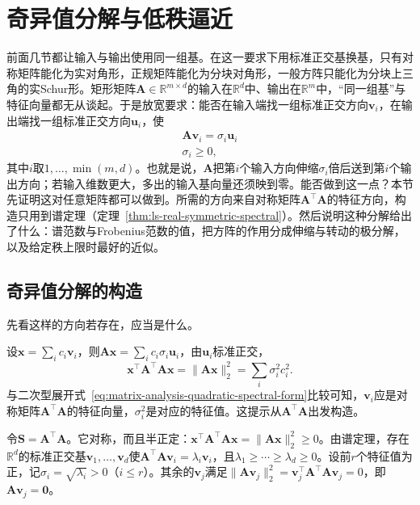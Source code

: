 
\section{奇异值分解与低秩逼近}
\label{sec:ls-svd}

前面几节都让输入与输出使用同一组基。在这一要求下用标准正交基换基，只有对称矩阵能化为实对角形，正规矩阵能化为分块对角形，一般方阵只能化为分块上三角的实Schur形。矩形矩阵$\bm A\in\mathbb R^{m\times d}$的输入在$\mathbb R^d$中、输出在$\mathbb R^m$中，“同一组基”与特征向量都无从谈起。于是放宽要求：能否在输入端找一组标准正交方向$\bm v_i$，在输出端找一组标准正交方向$\bm u_i$，使
\[
\begin{gathered}
\bm A\bm v_i=\sigma_i\bm u_i\\
\sigma_i\geq0,
\end{gathered}
\]
其中$i$取$1,\ldots,\min(m,d)$。也就是说，$\bm A$把第$i$个输入方向伸缩$\sigma_i$倍后送到第$i$个输出方向；若输入维数更大，多出的输入基向量还须映到零。能否做到这一点？本节先证明这对任意矩阵都可以做到。所需的方向来自对称矩阵$\bm A^\top\bm A$的特征方向，构造只用到谱定理（定理~\ref{thm:ls-real-symmetric-spectral}）。然后说明这种分解给出了什么：谱范数与Frobenius范数的值，把方阵的作用分成伸缩与转动的极分解，以及给定秩上限时最好的近似。

\subsection{奇异值分解的构造}

先看这样的方向若存在，应当是什么。

设$\bm x=\sum_ic_i\bm v_i$，则$\bm A\bm x=\sum_ic_i\sigma_i\bm u_i$，由$\bm u_i$标准正交，
\[
 \bm x^\top\bm A^\top\bm A\bm x=\lVert\bm A\bm x\rVert_2^2=\sum_i\sigma_i^2c_i^2 .
\]
与二次型展开式~\eqref{eq:matrix-analysis-quadratic-spectral-form}比较可知，$\bm v_i$应是对称矩阵$\bm A^\top\bm A$的特征向量，$\sigma_i^2$是对应的特征值。这提示从$\bm A^\top\bm A$出发构造。

令$\bm S=\bm A^\top\bm A$。它对称，而且半正定：$\bm x^\top\bm A^\top\bm A\bm x=\lVert\bm A\bm x\rVert_2^2\geq0$。由谱定理，存在$\mathbb R^d$的标准正交基$\bm v_1,\ldots,\bm v_d$使$\bm A^\top\bm A\bm v_i=\lambda_i\bm v_i$，且$\lambda_1\geq\cdots\geq\lambda_d\geq0$。设前$r$个特征值为正，记$\sigma_i=\sqrt{\lambda_i}>0$（$i\leq r$）。其余的$\bm v_j$满足$\lVert\bm A\bm v_j\rVert_2^2=\bm v_j^\top\bm A^\top\bm A\bm v_j=0$，即$\bm A\bm v_j=\bm0$。

